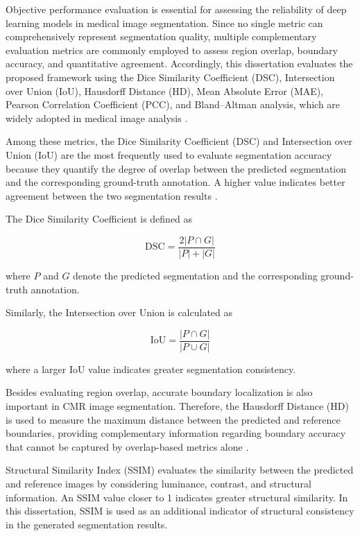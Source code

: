 Objective performance evaluation is essential for assessing the reliability of deep learning models in medical image segmentation. Since no single metric can comprehensively represent segmentation quality, multiple complementary evaluation metrics are commonly employed to assess region overlap, boundary accuracy, and quantitative agreement. Accordingly, this dissertation evaluates the proposed framework using the Dice Similarity Coefficient (DSC), Intersection over Union (IoU), Hausdorff Distance (HD), Mean Absolute Error (MAE), Pearson Correlation Coefficient (PCC), and Bland--Altman analysis, which are widely adopted in medical image analysis \citep{Taha2015,Zou2004}.

Among these metrics, the Dice Similarity Coefficient (DSC) and Intersection over Union (IoU) are the most frequently used to evaluate segmentation accuracy because they quantify the degree of overlap between the predicted segmentation and the corresponding ground-truth annotation. A higher value indicates better agreement between the two segmentation results \citep{Milletari2016,Taha2015}.

The Dice Similarity Coefficient is defined as

\begin{equation}
	\mathrm{DSC}=\frac{2|P\cap G|}{|P|+|G|}
	\label{eq:dsc}
\end{equation}

where $P$ and $G$ denote the predicted segmentation and the corresponding ground-truth annotation.

Similarly, the Intersection over Union is calculated as

\begin{equation}
	\mathrm{IoU}=\frac{|P\cap G|}{|P\cup G|}
	\label{eq:iou}
\end{equation}

where a larger IoU value indicates greater segmentation consistency.

Besides evaluating region overlap, accurate boundary localization is also important in CMR image segmentation. Therefore, the Hausdorff Distance (HD) is used to measure the maximum distance between the predicted and reference boundaries, providing complementary information regarding boundary accuracy that cannot be captured by overlap-based metrics alone \citep{Taha2015}.

Structural Similarity Index (SSIM) evaluates the similarity between the predicted and reference images by considering luminance, contrast, and structural information. An SSIM value closer to 1 indicates greater structural similarity. In this dissertation, SSIM is used as an additional indicator of structural consistency in the generated segmentation results.

